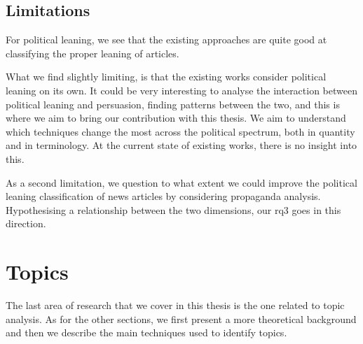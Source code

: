 







\subsection{\statusgreen Limitations}

For political leaning, we see that the existing approaches are quite good at classifying the proper leaning of articles.

What we find slightly limiting, is that the existing works consider political leaning on its own. It could be very interesting to analyse the interaction between political leaning and persuasion, finding patterns between the two, and this is where we aim to bring our contribution with this thesis.
We aim to understand which techniques change the most across the political spectrum, both in quantity and in terminology. At the current state of existing works, there is no insight into this.

As a second limitation, we question to what extent we could improve the political leaning classification of news articles by considering propaganda analysis.
Hypothesising a relationship between the two dimensions, our \acrshort{rq}3 goes in this direction.



\section{\statusorange Topics}
\label{sec:lit_topics}

The last area of research that we cover in this thesis is the one related to topic analysis.
As for the other sections, we first present a more theoretical background and then we describe the main techniques used to identify topics.

